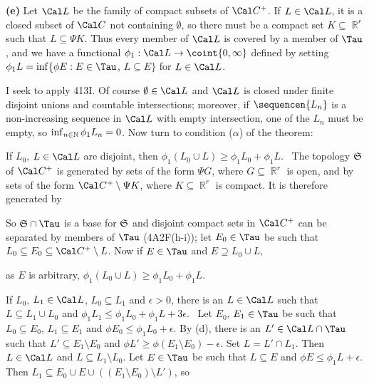 {\medskip

{\bf (e)} Let $\Cal L$ be the family of compact subsets of $\Cal C^+$.
If $L\in\Cal L$, it is a closed subset of $\Cal C$ not containing
$\emptyset$, so there must be a compact set $K\subseteq\BbbR^r$ such that
$L\subseteq\Psi K$.   Thus every member of $\Cal L$ is covered by a member
of $\Tau$, and we have a functional $\phi_1:\Cal L\to\coint{0,\infty}$
defined by setting $\phi_1L=\inf\{\phi E:E\in\Tau$, $L\subseteq E\}$ for
$L\in\Cal L$.

I seek to apply 413I.   Of course $\emptyset\in\Cal L$ and $\Cal L$ is
closed under finite disjoint unions and countable intersections;  moreover,
if $\sequencen{L_n}$ is a non-increasing sequence in $\Cal L$ with empty
intersection, one of the $L_n$ must be empty, so
$\inf_{n\in\Bbb N}\phi_1L_n=0$.   Now turn to condition ($\alpha$) of the
theorem:


\medskip

 If $L_0$, $L\in\Cal L$ are disjoint, then
$\phi_1(L_0\cup L)\ge\phi_1L_0+\phi_1L$.   \Prf\ The topology $\frak S$ of
$\Cal C^+$ is generated by sets of the form $\Psi G$, where
$G\subseteq\BbbR^r$ is open, and by sets of the form
$\Cal C^+\setminus\Psi K$, where $K\subseteq\BbbR^r$ is compact.
It is therefore generated by


\noindent So $\frak S\cap\Tau$ is a base for $\frak S$ and disjoint
compact sets in $\Cal C^+$ can be separated by members of $\Tau$
(4A2F(h-i));  let $E_0\in\Tau$ be such that
$L_0\subseteq E_0\subseteq\Cal C^+\setminus L$.   Now if $E\in\Tau$ and
$E\supseteq L_0\cup L$,


\noindent as $E$ is arbitrary,
$\phi_1(L_0\cup L)\ge\phi_1L_0+\phi_1L$.\ \Qed

\medskip

 If $L_0$, $L_1\in\Cal L$, $L_0\subseteq L_1$ and
$\epsilon>0$, there is an $L\in\Cal L$ such that
$L\subseteq L_1\cup L_0$ and $\phi_1L_1\le\phi_1L_0+\phi_1L+3\epsilon$.
\Prf\ Let $E_0$, $E_1\in\Tau$ be such that $L_0\subseteq E_0$,
$L_1\subseteq E_1$ and $\phi E_0\le\phi_1L_0+\epsilon$.
By (d), there is an
$L'\in\Cal L\cap\Tau$ such that $L'\subseteq E_1\setminus E_0$ and
$\phi L'\ge\phi(E_1\setminus E_0)-\epsilon$.   Set $L=L'\cap L_1$.
Then $L\in\Cal L$ and $L\subseteq L_1\setminus L_0$.   Let $E\in\Tau$ be
such that $L\subseteq E$ and $\phi E\le\phi_1L+\epsilon$.   Then
$L_1\subseteq E_0\cup E\cup((E_1\setminus E_0)\setminus L')$, so

}

